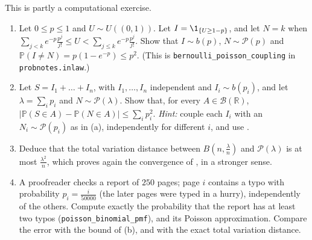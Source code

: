 \begin{exercise}\label{ex:cl-le-cam}
\hard This is partly a computational exercise.
\begin{enumerate}[label=(\alph*)]
  \item Let $0\le p\le1$ and $U\sim U((0,1))$. Let $I=\1_{\{U\ge1-p\}}$, and let $N=k$ when
    $\sum_{j<k}e^{-p}\frac{p^j}{j!}\le U<\sum_{j\le k}e^{-p}\frac{p^j}{j!}$. Show that $I\sim b(p)$,
    $N\sim\mathcal P(p)$ and $\mathbb P(I\ne N)=p(1-e^{-p})\le p^2$. (This is
    \texttt{bernoulli\_poisson\_coupling} in \texttt{probnotes.inlaw}.)
  \item Let $S=I_1+\dots+I_n$, with $I_1,\dots,I_n$ independent and $I_i\sim b(p_i)$, and let
    $\lambda=\sum_ip_i$ and $N\sim\mathcal P(\lambda)$. Show that, for every
    $A\in\mathcal B(\mathbb R)$, $|\mathbb P(S\in A)-\mathbb P(N\in A)|\le\sum_ip_i^2$. \emph{Hint:}
    couple each $I_i$ with an $N_i\sim\mathcal P(p_i)$ as in (a), independently for different
    $i$, and use .
  \item Deduce that the total variation distance between $B(n,\frac\lambda n)$ and
    $\mathcal P(\lambda)$ is at most $\frac{\lambda^2}n$, which proves again the convergence of
    , in a stronger sense.
  \item A proofreader checks a report of $250$ pages; page $i$ contains a typo with probability
    $p_i=\frac i{50000}$ (the later pages were typed in a hurry), independently of the others.
    Compute exactly the probability that the report has at least two typos
    (\texttt{poisson\_binomial\_pmf}), and its Poisson approximation. Compare the error with the
    bound of (b), and with the exact total variation distance.
\end{enumerate}
\end{exercise}

